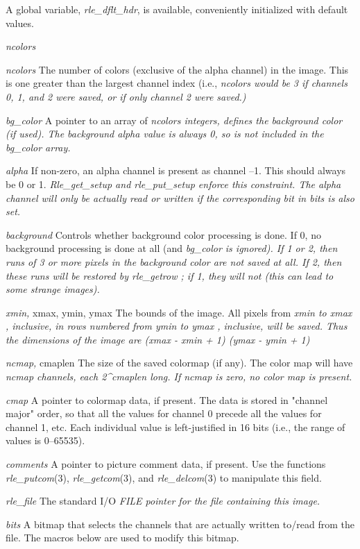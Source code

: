 A global variable,
{\it rle\_dflt\_hdr}{\rm ,}
is available, conveniently initialized with default values.
\begin{TPlist}{{\it ncolors}}
\item[{{\it ncolors}}]
The number of colors (exclusive of the alpha channel) in the image.
This is one greater than the largest channel index (i.e.,
%
\it ncolors \rm%
would be 3 if channels 0, 1, and 2 were saved, or if
only channel 2 were saved.)
\item[{{\it bg\_color}}]
A pointer to an array of %
\it ncolors \rm%
integers, defines the
background color (if used).  The background alpha value is always 0,
so is not included in the %
\it bg\_color \rm%
array.
\item[{{\it alpha}}]
If non-zero, an alpha channel is present as channel --1.  This
should always be 0 or 1.  %
\it Rle\_get\_setup \rm%
and %
\it rle\_put\_setup \rm%
enforce this constraint.  The alpha channel will only be actually read
or written if the corresponding bit in %
\it bits \rm%
is also set.
\item[{{\it background}}]
Controls whether background color processing is done.  If 0, no
background processing is done at all (and %
\it bg\_color \rm%
is ignored).
If 1 or 2, then runs of 3 or more pixels in the background color are
not saved at all.  If 2, then these runs will be restored by
%
\it rle\_getrow\rm%
; if 1, they will not (this can lead to some strange
images).
\item[{{\it xmin,} xmax, ymin, ymax}]
The bounds of the image.  All pixels from %
\it xmin \rm%
to %
\it xmax\rm%
,
inclusive, in rows numbered from %
\it ymin \rm%
to %
\it ymax\rm%
, inclusive,
will be saved.  Thus the dimensions of the image are
\nwl
\it
	(xmax - xmin + 1)  (ymax - ymin + 1)
\item[{{\it ncmap,} cmaplen}]
The size of the saved colormap (if any).  The color map will have
%
\it ncmap \rm%
channels, each %
\it 2\^{}cmaplen \rm%
long.  If %
\it ncmap \rm%
is
zero, no color map is present.
\item[{{\it cmap}}]
A pointer to colormap data, if present.  The data is stored in
"channel major" order, so that all the values for channel 0 precede
all the values for channel 1, etc.  Each individual value is
left-justified in 16 bits (i.e., the range of values is 0--65535).
\item[{{\it comments}}]
A pointer to picture comment data, if present.  Use the functions
{\it rle\_putcom}{\rm (3),}
{\it rle\_getcom}{\rm (3),}
and
{\it rle\_delcom}{\rm (3)}
to manipulate this field.
\item[{{\it rle\_file}}]
The standard I/O %
\it FILE \rm%
pointer for the file containing this
image.
\item[{{\it bits}}]
A bitmap that selects the channels that are actually written to/read
from the file.  The macros below are used to modify this bitmap.
\end{TPlist}
